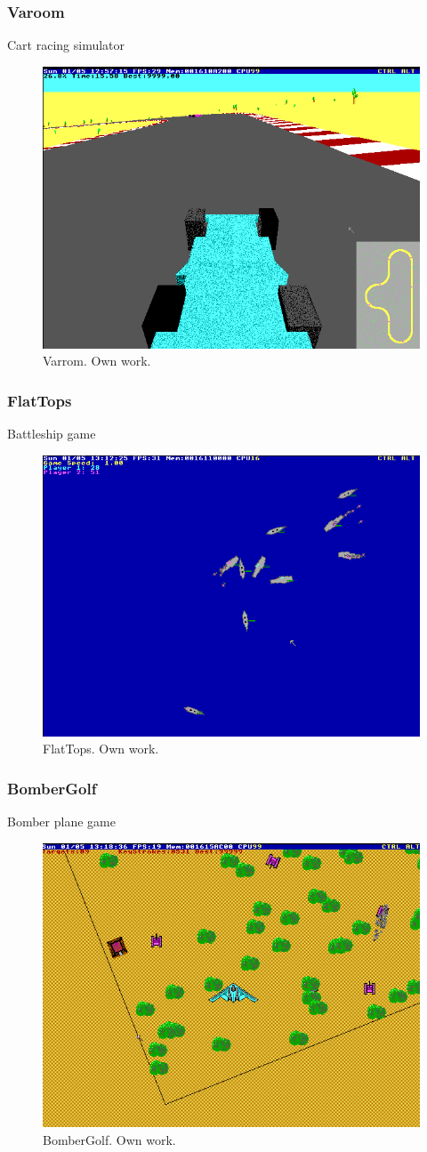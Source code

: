 \documentclass{beamer}
\begin{document}
	\begin{frame}
		\frametitle{Varoom}
		Cart racing simulator
		\begin{figure}
			\centering
			\includegraphics[width=0.6\linewidth]{images/varoom.png}
			\caption{Varrom. Own work.}
			\label{fig:varoom}
		\end{figure}
	\end{frame}

	\begin{frame}
		\frametitle{FlatTops}
		Battleship game
		\begin{figure}
			\centering
			\includegraphics[width=0.6\linewidth]{images/flat_tops.png}
			\caption{FlatTops. Own work.}
			\label{fig:flat_tops}
		\end{figure}
	\end{frame}

	\begin{frame}
		\frametitle{BomberGolf}
		Bomber plane game
		\begin{figure}
			\centering
			\includegraphics[width=0.6\linewidth]{images/bomber_golf.png}
			\caption{BomberGolf. Own work.}
			\label{fig:bomber_golf}
		\end{figure}
	\end{frame}
\end{document}
